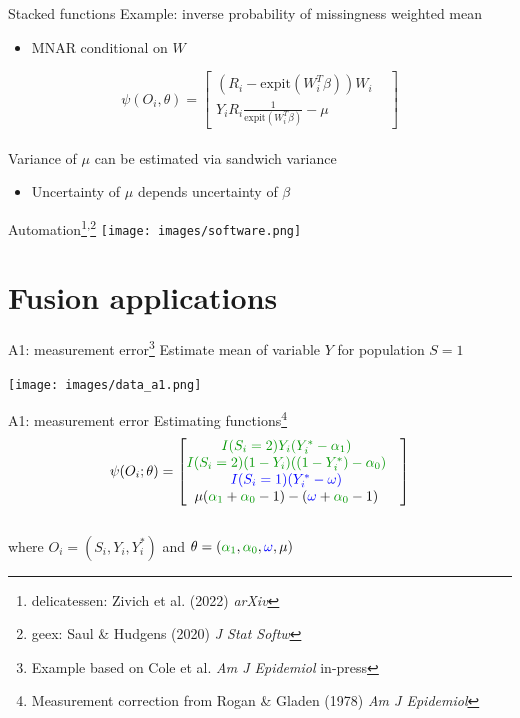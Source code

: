 \documentclass{beamer}
\newcommand{\blue}[1]{\textcolor{blue}{#1}}
\newcommand{\green}[1]{\textcolor{ForestGreen}{#1}}
\begin{document}
\begin{frame}{Stacked functions}
	Example: inverse probability of missingness weighted mean
	\begin{itemize}
		\item MNAR conditional on $W$ 
	\end{itemize}
	\[\psi(O_i, \theta) = 
	\begin{bmatrix}
		\left(R_i - \text{expit}(W_i^T \beta)\right) W_i & \\
		Y_i R_i \frac{1}{\text{expit}(W_i^T \beta)} - \mu & 
	\end{bmatrix}\]~\\
	Variance of $\mu$ can be estimated via sandwich variance
	\begin{itemize}
		\item Uncertainty of $\mu$ depends uncertainty of $\beta$
	\end{itemize}
\end{frame}

\begin{frame}{Automation\footnote[frame]{delicatessen: Zivich et al. (2022) \textit{arXiv}}\textsuperscript{,}\footnote[frame]{geex: Saul \& Hudgens (2020) \textit{J Stat Softw}}}
	\centering
	\texttt{[image: images/software.png]}	
\end{frame}

\section{Fusion applications}

\begin{frame}{A1: measurement error\footnote[frame]{Example based on Cole et al. \textit{Am J Epidemiol} in-press}}
	Estimate mean of variable $Y$ for population $S=1$
	\begin{center}
		\texttt{[image: images/data\_a1.png]}
	\end{center}
\end{frame}

\begin{frame}{A1: measurement error}
	Estimating functions\footnote[frame]{Measurement correction from Rogan \& Gladen (1978) \textit{Am J Epidemiol}}
	\[\psi(O_i; \theta) = 
	\begin{bmatrix}
		\green{I(S_i = 2) Y_i (Y_i^* - \alpha_1)} & \\
		\green{I(S_i = 2) (1-Y_i) (\left(1-Y_i^*) - \alpha_0\right)} & \\
		\blue{I(S_i = 1) (Y_i^* - \omega)} & \\
		\mu(\green{\alpha_1} + \green{\alpha_0} - 1) - (\blue{\omega} + \green{\alpha_0} - 1)		
	\end{bmatrix}\]~\\
	where $O_i = (S_i, Y_i, Y_i^*)$ and $\theta = (\green{\alpha_1}, \green{\alpha_0}, \blue{\omega}, \mu)$
\end{frame}
\end{document}
